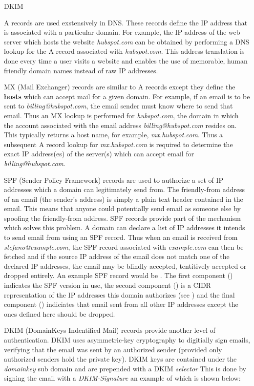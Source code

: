 \begin{labeling}{DKIM }
  \item[A] A records are used exstensively in DNS. These records define the IP address that is associated with a particular domain. For example, the IP address of the web server which hosts the website \textit{hubspot.com} can be obtained by performing a DNS lookup for the A record associated with \textit{hubspot.com}. This address translation is done every time a user visits a website and enables the use of memorable, human friendly domain names instead of raw IP addresses.
  \item[MX] MX (Mail Exchanger) records are similar to A records except they define the \textbf{hosts} which can accept mail for a given domain. For example, if an email is to be sent to \textit{billing@hubspot.com}, the email sender must know where to send that email. Thus an MX lookup is performed for \textit{hubspot.com}, the domain in which the account associated with the email address \textit{billing@hubspot.com} resides on. This typically returns a host name, for example, \textit{mx.hubspot.com}. Thus a subsequent A record lookup for \textit{mx.hubspot.com} is required to determine the exact IP address(es) of the server(s) which can accept email for \textit{billing@hubspot.com}.
  \item[SPF] SPF (Sender Policy Framework) records are used to authorize a set of IP addresses which a domain can legitimately send from. The friendly-from address of an email (the sender's address) is simply a plain text header contained in the email. This means that anyone could potentially send email as someone else by spoofing the friendly-from address. SPF records provide part of the mechanism which solves this problem. A domain can declare a list of IP addresses it intends to send email from using an SPF record. Thus when an email is received from \textit{stefano@example.com}, the SPF record associated with \textit{example.com} can then be fetched and if the source IP address of the email does not match one of the declared IP addresses, the email may be blindly accepted, tentitively accepted or dropped entirely. An example SPF record would be . The first component () indicates the SPF version in use, the second component () is a CIDR representation of the IP addresses this domain authorizes (see ) and the final component () indiciates that email sent from all other IP addresses except the ones defined here should be dropped. 
  \item[DKIM] DKIM (DomainKeys Indentified Mail) records provide another level of authentication. DKIM uses asymmetric-key cryptography to digitially sign emails, verifying that the email was sent by an authorized sender (provided only authorized senders hold the private key). DKIM keys are contained under the \textit{\textunderscore domainkey} sub domain and are prepended with a DKIM \textit{selector} This is done by signing the email with a \textit{DKIM-Signature} an example of which is shown below:


\end{labeling}
